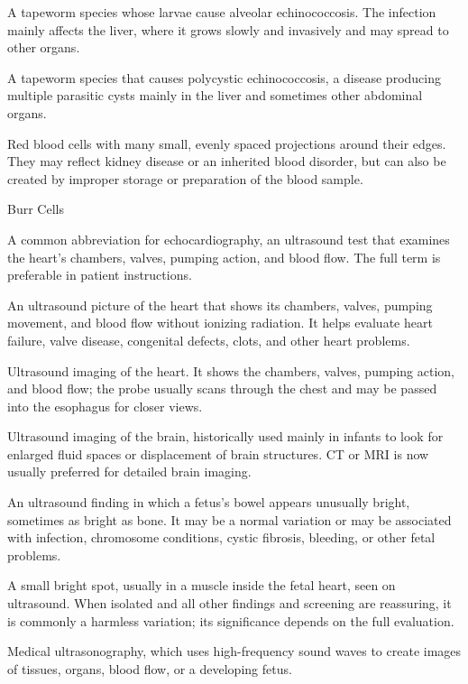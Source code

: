  A tapeworm species whose larvae cause alveolar echinococcosis. The infection mainly affects the liver, where it grows slowly and invasively and may spread to other organs.

 A tapeworm species that causes polycystic echinococcosis, a disease producing multiple parasitic cysts mainly in the liver and sometimes other abdominal organs.

 Red blood cells with many small, evenly spaced projections around their edges. They may reflect kidney disease or an inherited blood disorder, but can also be created by improper storage or preparation of the blood sample.

\synonyms
Burr Cells

 A common abbreviation for echocardiography, an ultrasound test that examines the heart’s chambers, valves, pumping action, and blood flow. The full term is preferable in patient instructions.

 An ultrasound picture of the heart that shows its chambers, valves, pumping movement, and blood flow without ionizing radiation. It helps evaluate heart failure, valve disease, congenital defects, clots, and other heart problems.

 Ultrasound imaging of the heart. It shows the chambers, valves, pumping action, and blood flow; the probe usually scans through the chest and may be passed into the esophagus for closer views.

 Ultrasound imaging of the brain, historically used mainly in infants to look for enlarged fluid spaces or displacement of brain structures. CT or MRI is now usually preferred for detailed brain imaging.

 An ultrasound finding in which a fetus’s bowel appears unusually bright, sometimes as bright as bone. It may be a normal variation or may be associated with infection, chromosome conditions, cystic fibrosis, bleeding, or other fetal problems.

 A small bright spot, usually in a muscle inside the fetal heart, seen on ultrasound. When isolated and all other findings and screening are reassuring, it is commonly a harmless variation; its significance depends on the full evaluation.

 Medical ultrasonography, which uses high-frequency sound waves to create images of tissues, organs, blood flow, or a developing fetus.

